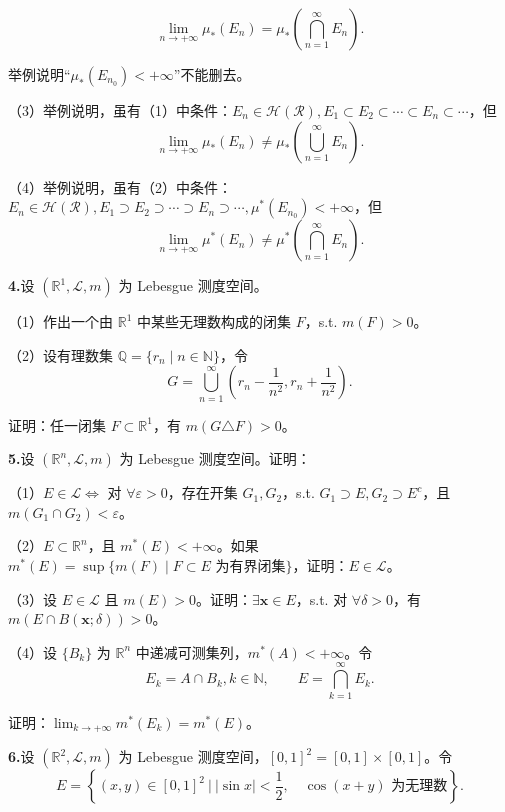 \documentclass[11pt,a4paper]{article}
\begin{document}
\[\lim_{n\to+\infty}\mu_*(E_n)=\mu_*\left(\bigcap_{n=1}^\infty E_n\right).\]
\par\noindent 举例说明“$\mu_*(E_{n_0})<+\infty$”不能删去。
\par\noindent （3）举例说明，虽有（1）中条件：$E_n\in\mathcal H(\mathcal R),E_1\subset E_2\subset\cdots\subset E_n\subset\cdots$，但
\[\lim_{n\to+\infty}\mu_*(E_n)\ne\mu_*\left(\bigcup_{n=1}^\infty E_n\right).\]
\par\noindent （4）举例说明，虽有（2）中条件：$E_n\in\mathcal H(\mathcal R),E_1\supset E_2\supset\cdots\supset E_n\supset\cdots,\mu^*(E_{n_0})<+\infty$，但
\[\lim_{n\to+\infty}\mu^*(E_n)\ne\mu^*\left(\bigcap_{n=1}^\infty E_n\right).\]
\par{}\noindent\textbf{4.}\quad 设 $(\mathbb R^1,\mathcal L,m)$ 为 Lebesgue 测度空间。
\par\noindent （1）作出一个由 $\mathbb R^1$ 中某些无理数构成的闭集 $F$，s.t. $m(F)>0$。
\par\noindent （2）设有理数集 $\mathbb Q=\{r_n\mid n\in\mathbb N\}$，令
\[G=\bigcup_{n=1}^\infty\left(r_n-\frac1{n^2},r_n+\frac1{n^2}\right).\]
\par\noindent 证明：任一闭集 $F\subset\mathbb R^1$，有 $m(G\triangle F)>0$。
\par{}\noindent\textbf{5.}\quad 设 $(\mathbb R^n,\mathcal L,m)$ 为 Lebesgue 测度空间。证明：
\par\noindent （1）$E\in\mathcal L\Leftrightarrow$ 对 $\forall\varepsilon>0$，存在开集 $G_1,G_2$，s.t. $G_1\supset E,G_2\supset E^c$，且 $m(G_1\cap G_2)<\varepsilon$。
\par\noindent （2）$E\subset\mathbb R^n$，且 $m^*(E)<+\infty$。如果 $m^*(E)=\sup\{m(F)\mid F\subset E\text{ 为有界闭集}\}$，证明：$E\in\mathcal L$。
\par\noindent （3）设 $E\in\mathcal L$ 且 $m(E)>0$。证明：$\exists\boldsymbol{x}\in E$，s.t. 对 $\forall\delta>0$，有 $m(E\cap B(\boldsymbol{x};\delta))>0$。
\par\noindent （4）设 $\{B_k\}$ 为 $\mathbb R^n$ 中递减可测集列，$m^*(A)<+\infty$。令
\[E_k=A\cap B_k,k\in\mathbb N,\qquad E=\bigcap_{k=1}^\infty E_k.\]
\par\noindent 证明：$\lim_{k\to+\infty}m^*(E_k)=m^*(E)$。
\par{}\noindent\textbf{6.}\quad 设 $(\mathbb R^2,\mathcal L,m)$ 为 Lebesgue 测度空间，$[0,1]^2=[0,1]\times[0,1]$。令
\[E=\left\{(x,y)\in[0,1]^2\ \bigg|\ |\sin x|<\frac12,\quad \cos(x+y)\text{ 为无理数}\right\}.\]
\end{document}
